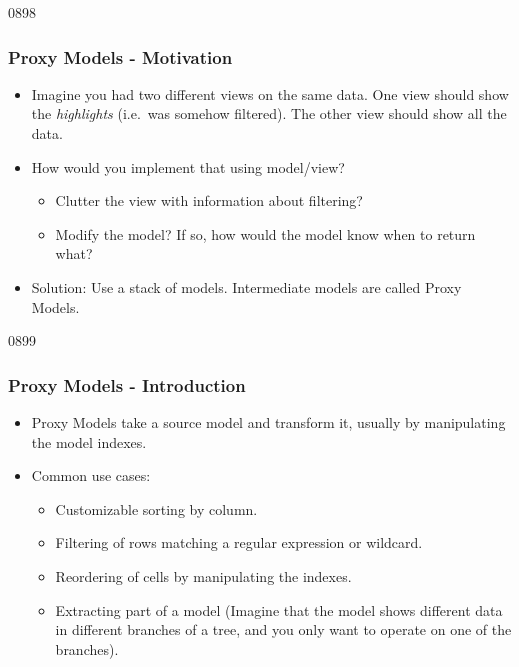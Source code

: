 \begin{slide}{0898}\frametitle{Proxy Models - Motivation}\label{proxymodels}
  \begin{itemize}
  \item Imagine you had two different views on the same data. One view
    should show the \emph{highlights} (i.e.\ was somehow filtered). The other
    view should show all the data.
  \item How would you implement that using model/view?
    \begin{itemize}
    \item Clutter the view with information about filtering?
    \item Modify the model? If so, how would the model know when to return what?
    \end{itemize}
  \item Solution: Use a stack of models. Intermediate models are called Proxy
    Models. 
  \end{itemize}
\end{slide}

\begin{slide}[fragile]{0899}\frametitle{Proxy Models - Introduction}
  \begin{itemize}
  \item Proxy Models take a source model and transform it, usually by manipulating
    the model indexes.
  \item Common use cases:
    \begin{itemize}
    \item Customizable sorting by column.
    \item Filtering of rows matching a regular expression or wildcard.
    \item Reordering of cells by manipulating the indexes.
    \item Extracting part of a model (Imagine that the model shows different
      data in different branches of a tree, and you only want to operate on
      one of the branches).
    \end{itemize}
  \end{itemize}
 
\end{slide}

